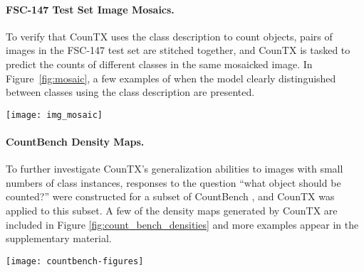 \documentclass{bmvc2k}
\begin{document}
\paragraph{FSC-147 Test Set Image Mosaics.}To verify that CounTX uses the class description to count objects, pairs of images in the FSC-147 test set are stitched together, and CounTX is tasked to predict the counts of different classes in the same mosaicked image. In Figure~\ref{fig:mosaic}, a few examples of when the model clearly distinguished between classes using the class description are presented.
\begin{figure*}[h!]
\begin{center}
\texttt{[image: img\_mosaic]}
\end{center}\vspace{-5mm}
   \caption{Evaluation on composite images. CounTX uses the class description to identify the object to count. This is clear by how the density map highlights only the regions specified by the class description in each example.}
\label{fig:mosaic}
\vspace{-3mm}
\end{figure*}

\paragraph{CountBench Density Maps.} To further investigate CounTX's generalization abilities to images with small numbers of class instances, responses to the question ``what object should be counted?'' were constructed for a subset of CountBench \cite{paiss2023countclip}, and CounTX was applied to this subset. A few of the density maps generated by CounTX are included in Figure \ref{fig:count_bench_densities} and more examples appear in the supplementary material.
\begin{figure*}[h!]
\centering
\texttt{[image: countbench-figures]}
\vspace{-5mm}
   \caption{Density maps produced by CounTX when applied to the CountBench subset.}
\label{fig:count_bench_densities}
\end{figure*}
\end{document}
